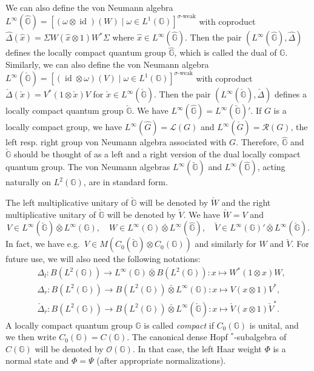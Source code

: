 \documentclass[reqno]{amsart}
\numberwithin{equation}{section}
\DeclareMathOperator{\id}{\mathrm{id}}
\newcommand{\G}{\mathbb{G}}
\newcommand{\ovot}{\bar{\otimes}}
\begin{document}
We can also define the von Neumann algebra
$L^\infty(\hat{\G}) = [(\omega\otimes \id)(W) \mid \omega \in L^1(\G)]^{\sigma\textrm{-weak}}$
with coproduct
$\hat{\Delta}(\hat{x}) = \Sigma W(\hat{x}\otimes 1)W^*\Sigma$ where $\hat{x}\in L^\infty(\hat{\G})$. 
Then the pair $(L^\infty(\hat{\G}), \hat{\Delta})$ defines the locally compact quantum group $\hat{\G}$, which is called the dual of $\G$. Similarly, we can also define the von Neumann algebra $L^\infty(\check{\G}) = [(\id\otimes \omega)(V) \mid \omega \in L^1(\G)]^{\sigma\textrm{-weak}}$
with coproduct 
$\check{\Delta}(\check{x}) = V^*(1\otimes \check{x})V$ for $\check{x}\in L^\infty(\check{\G})$.
Then the pair $(L^\infty(\check{\G}), \check{\Delta})$ defines a locally compact quantum group $\check{\G}$. We have $L^\infty(\hat{\G})= L^\infty(\check{\G})'$. If $G$ is a locally compact group, we have
$L^\infty(\hat{G}) = \mathscr{L}(G)$ and $L^\infty(\check{G}) = \mathscr{R}(G)$, the left resp. right group von Neumann algebra associated with $G$. Therefore, $\hat{\G}$ and $\check{\G}$ should be thought of as a left and a right version of the dual locally compact quantum group. The von Neumann algebras $L^\infty(\check{\G})$ and $L^\infty(\hat{\G})$, acting naturally on $L^2(\G)$, are in standard form.

The left multiplicative unitary of $\check{\G}$ will be denoted by $\check{W}$ and the right multiplicative unitary of $\check{\G}$ will be denoted by $\check{V}$. We have $\check{W}= V$ and 
$$V \in L^\infty(\check{\G})\ovot L^\infty(\G), \quad W \in L^\infty(\G)\ovot L^\infty(\hat{\G}), \quad \check{V}\in L^\infty(\G)'\ovot L^\infty(\check{\G}).$$
In fact, we have e.g.\ $V\in M(C_0(\check{\G})\otimes C_0(\G))$ and similarly for $W$ and  $\check{V}$. For future use, we will also need the following notations:
\begin{align*}
    &\Delta_l: B(L^2(\G)) \to  L^\infty(\G)\ovot B(L^2(\G)): x \mapsto W^*(1\otimes x)W,\\
    &\Delta_r: B(L^2(\G))\to B(L^2(\G))\ovot L^\infty(\G): x \mapsto V(x\otimes 1)V^*,\\
    &\check{\Delta}_r: B(L^2(\G))\to B(L^2(\G)) \ovot L^\infty(\check{\G}): x \mapsto \check{V}(x\otimes 1)\check{V}^*.
\end{align*}
A locally compact quantum group $\G$ is called \emph{compact} if $C_0(\G)$ is unital, and we then write $C_0(\G)= C(\G)$. The canonical dense Hopf $^*$-subalgebra of $C(\G)$ will be denoted by $\mathcal{O}(\G)$. In that case, the left Haar weight $\Phi$ is a normal state and $\Phi = \Psi$ (after appropriate normalizations).
\end{document}
